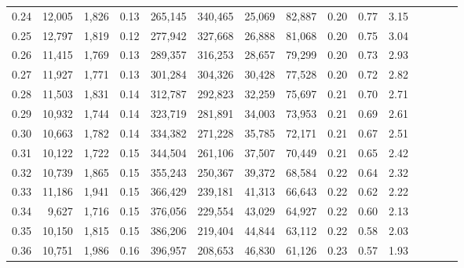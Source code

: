 \begin{tabular}{rrrcrrrrrrrrrrr}
0.24 &  12,005 &  1,826 &                                       0.13 &  265,145 &  340,465 &   25,069 &   82,887 &  0.20 &  0.77 &                         3.15 \\
0.25 &  12,797 &  1,819 &                                       0.12 &  277,942 &  327,668 &   26,888 &   81,068 &  0.20 &  0.75 &                         3.04 \\
0.26 &  11,415 &  1,769 &                                       0.13 &  289,357 &  316,253 &   28,657 &   79,299 &  0.20 &  0.73 &                         2.93 \\
0.27 &  11,927 &  1,771 &                                       0.13 &  301,284 &  304,326 &   30,428 &   77,528 &  0.20 &  0.72 &                         2.82 \\
0.28 &  11,503 &  1,831 &                                       0.14 &  312,787 &  292,823 &   32,259 &   75,697 &  0.21 &  0.70 &                         2.71 \\
0.29 &  10,932 &  1,744 &                                       0.14 &  323,719 &  281,891 &   34,003 &   73,953 &  0.21 &  0.69 &                         2.61 \\
0.30 &  10,663 &  1,782 &                                       0.14 &  334,382 &  271,228 &   35,785 &   72,171 &  0.21 &  0.67 &                         2.51 \\
0.31 &  10,122 &  1,722 &                                       0.15 &  344,504 &  261,106 &   37,507 &   70,449 &  0.21 &  0.65 &                         2.42 \\
0.32 &  10,739 &  1,865 &                                       0.15 &  355,243 &  250,367 &   39,372 &   68,584 &  0.22 &  0.64 &                         2.32 \\
0.33 &  11,186 &  1,941 &                                       0.15 &  366,429 &  239,181 &   41,313 &   66,643 &  0.22 &  0.62 &                         2.22 \\
0.34 &   9,627 &  1,716 &                                       0.15 &  376,056 &  229,554 &   43,029 &   64,927 &  0.22 &  0.60 &                         2.13 \\
0.35 &  10,150 &  1,815 &                                       0.15 &  386,206 &  219,404 &   44,844 &   63,112 &  0.22 &  0.58 &                         2.03 \\
0.36 &  10,751 &  1,986 &                                       0.16 &  396,957 &  208,653 &   46,830 &   61,126 &  0.23 &  0.57 &                         1.93 \\

\end{tabular}
